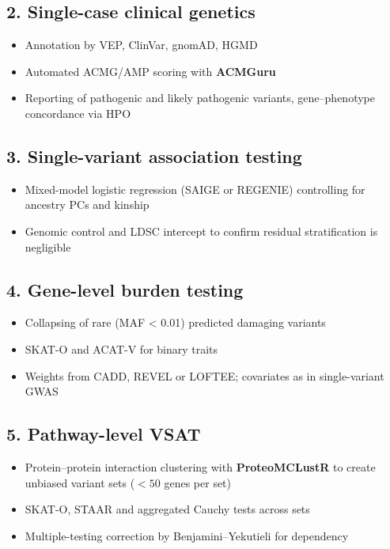 \subsection*{2. Single-case clinical genetics}
\begin{itemize}
  \item Annotation by VEP, ClinVar, gnomAD, HGMD  
  \item Automated ACMG/AMP scoring with \textbf{ACMGuru} \cite{Lawless2025ACMGuru}  
  \item Reporting of pathogenic and likely pathogenic variants, gene–phenotype concordance via HPO
\end{itemize}

\subsection*{3. Single-variant association testing}
\begin{itemize}
  \item Mixed-model logistic regression (SAIGE or REGENIE) controlling for ancestry PCs and kinship \cite{Zhou2020SAIGE}  
  \item Genomic control and LDSC intercept to confirm residual stratification is negligible
\end{itemize}

\subsection*{4. Gene-level burden testing}
\begin{itemize}
  \item Collapsing of rare (MAF < 0.01) predicted damaging variants  
  \item SKAT-O and ACAT-V for binary traits \cite{Lee2012SKATO}  
  \item Weights from CADD, REVEL or LOFTEE; covariates as in single-variant GWAS
\end{itemize}

\subsection*{5. Pathway-level VSAT}
\begin{itemize}
  \item Protein–protein interaction clustering with \textbf{ProteoMCLustR} to create unbiased variant sets (\(<50\) genes per set) \cite{Lawless2025ProteoMCLustR}  
  \item SKAT-O, STAAR and aggregated Cauchy tests across sets  
  \item Multiple-testing correction by Benjamini–Yekutieli for dependency
\end{itemize}

